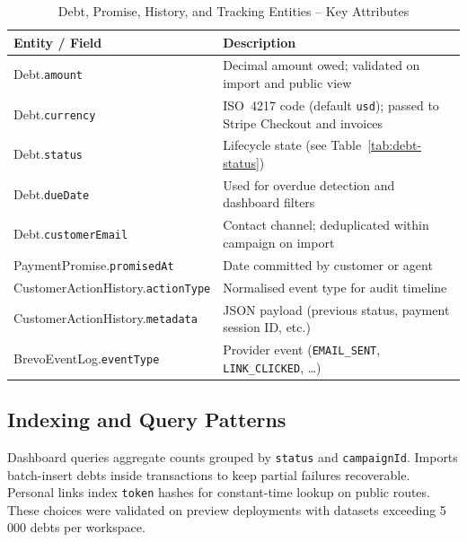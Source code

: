 \documentclass[12pt,a4paper]{report}
\newcommand{\reporttablesetup}{%
  \small%
  \setlength{\tabcolsep}{5pt}%
  \renewcommand{\arraystretch}{1.22}%
  \arrayrulecolor{framegray}%
}
\begin{document}
\begin{table}[!htbp]
  \centering
  \reporttablesetup
  \footnotesize
  \begin{tabularx}{\textwidth}{|p{5.5cm}|Y|}
    \hline
    \textbf{Entity / Field} & \textbf{Description} \\
    \hline
    Debt.\allowbreak\texttt{amount}   & Decimal amount owed; validated on import and
      public view \\
    \hline
    Debt.\allowbreak\texttt{currency} & ISO~4217 code (default \texttt{usd}); passed
      to Stripe Checkout and invoices \\
    \hline
    Debt.\allowbreak\texttt{status}   & Lifecycle state (see
      Table~\ref{tab:debt-status}) \\
    \hline
    Debt.\allowbreak\texttt{dueDate}  & Used for overdue detection and dashboard
      filters \\
    \hline
    Debt.\allowbreak\texttt{customerEmail} & Contact channel; deduplicated within
      campaign on import \\
    \hline
    PaymentPromise.\allowbreak\texttt{promisedAt} & Date committed by customer or
      agent \\
    \hline
    CustomerActionHistory.\allowbreak\texttt{actionType} & Normalised event type for
      audit timeline \\
    \hline
    CustomerActionHistory.\allowbreak\texttt{metadata} & JSON payload (previous
      status, payment session ID, etc.) \\
    \hline
    BrevoEventLog.\allowbreak\texttt{eventType} & Provider event
      (\texttt{EMAIL\_SENT}, \texttt{LINK\_CLICKED}, \ldots) \\
    \hline
  \end{tabularx}
  \caption{Debt, Promise, History, and Tracking Entities -- Key Attributes}
  \label{tab:entity-debt}
\end{table}

\subsection{Indexing and Query Patterns}

Dashboard queries aggregate counts grouped by \texttt{status} and
\texttt{campaignId}.
Imports batch-insert debts inside transactions to keep partial failures recoverable.
Personal links index \texttt{token} hashes for constant-time lookup on public routes.
These choices were validated on preview deployments with datasets exceeding 5\,000
debts per workspace.
\end{document}
